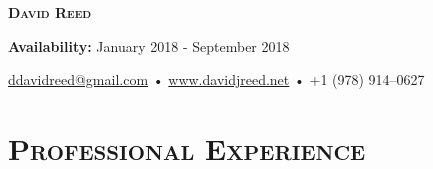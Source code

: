 \documentclass{article}
\begin{document}
\thispagestyle{empty}

\begin{center}
  {\LARGE\textsc{\textbf{David Reed}}}
\end{center}
\begin{center}
  \textbf{Availability:}
  January 2018 - September 2018
\end{center}
\begin{center}
  \href{mailto:ddavidreed@gmail.com}{ddavidreed@gmail.com} • \href{http://www.davidjreed.net/}{www.davidjreed.net} • +1 (978) 914--0627 \\
  \hrulefill
\end{center}



\section*{\textsc{Professional Experience}}
\end{document}
